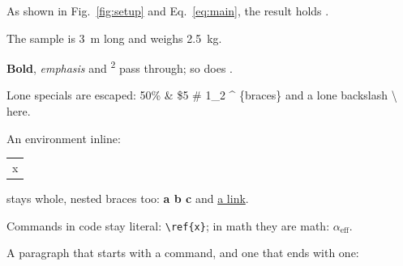 As shown in Fig.~\ref{fig:setup} and Eq.~\eqref{eq:main}, the result holds \cite{smith2020}.

The sample is \SI{3}{\metre} long and weighs \SI[round-mode=places]{2.5}{\kilo\gram}.

\textbf{Bold}, \emph{emphasis} and \textsuperscript{2} pass through; so does \citep[p.~4]{doe99}.

Lone specials are escaped: 50\% \& \$5 \# 1\_2 \^{} \{braces\} and a lone backslash \textbackslash{} here.

An environment inline: \begin{tabular}{c}x\end{tabular} stays whole, nested
braces too: \textbf{a {b} c} and \href{https://example.org/a_b}{a link}.

Commands in code stay literal: \texttt{\textbackslash{}ref\{x\}}; in math they are math: $\alpha_{\text{eff}}$.

\noindent A paragraph that starts with a command, and one that ends with one: \cite{a,b}

